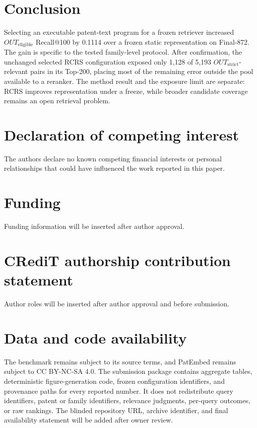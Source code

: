 \documentclass[final,5p,times,twocolumn]{elsarticle}
\newcommand{\RCRS}{RCRS}
\begin{document}
\section{Conclusion}

Selecting an executable patent-text program for a frozen retriever increased
\(OUT_{\mathrm{eligible}}\) Recall@100 by 0.1114 over a frozen static representation on Final-872.
The gain is specific to the tested family-level protocol. After confirmation,
the unchanged selected RCRS configuration exposed only 1,128 of 5,193
\(OUT_{\mathrm{strict}}\)-relevant pairs in
its Top-200, placing most of the remaining error outside the pool available to
a reranker. The method result and the exposure limit are separate: \RCRS{}
improves representation under a freeze, while broader candidate coverage
remains an open retrieval problem.

\section*{Declaration of competing interest}

The authors declare no known competing financial interests or personal
relationships that could have influenced the work reported in this paper.

\section*{Funding}

Funding information will be inserted after author approval.

\section*{CRediT authorship contribution statement}

Author roles will be inserted after author approval and before submission.

\section*{Data and code availability}

The benchmark remains subject to its source terms, and PatEmbed remains subject
to CC BY-NC-SA 4.0. The submission package contains aggregate tables,
deterministic figure-generation code, frozen configuration identifiers, and
provenance paths for every reported number. It does not redistribute query
identifiers, patent or family identifiers, relevance judgments, per-query
outcomes, or raw rankings. The blinded repository URL, archive identifier,
and final availability statement will be added after owner review.
\end{document}
